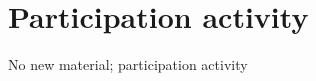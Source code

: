 \documentclass[a4paper]{article}
\begin{document}
\setcounter{section}{8} %
\section{Participation activity}
No new material; participation activity
\end{document}
